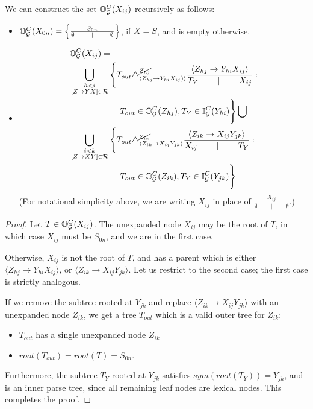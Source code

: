\documentclass{article}
\newcommand\Inner{\mathbb{I}}
\newcommand\Outer{\mathbb{O}}
\begin{document}
\begin{prop}
\label{prop-outer-set}
  We can construct the set $\Outer_\GGG^C(X_{ij})$ recursively as
  follows:
\begin{itemize}
\item $\Outer_\GGG^C(X_{0n}) = \left\{ \frac{S_{0n}}{\emptyset \qquad
      \mid \qquad \emptyset} \right\}$, if $X=S$, and is empty otherwise.
\item 
\begin{align*}
&\Outer_\GGG^C(X_{ij}) = \\
&\bigcup_{\substack{h < i \\ [Z \to YX]\in \RRR}}
\Bigg\{
T_{out} \triangle^{\cancel{Z_{hj}}}_{\langle Z_{hj} \to Y_{hi}
  X_{ij})\rangle} \frac{ \langle Z_{hj} \to Y_{hi}
  X_{ij} \rangle}{ T_Y \qquad \mid \qquad X_{ij}} : \\
&\qquad\qquad\qquad T_{out} \in \Outer_\GGG^C(Z_{hj}), T_Y \in \Inner_\GGG^C(Y_{hi}) 
\Bigg\} \bigcup\\
&\bigcup_{\substack{i < k \\ [Z \to
    XY]\in \RRR}}
\Bigg\{
T_{out} \triangle^{\cancel{Z_{ik}}}_{\langle Z_{ik} \to X_{ij} Y_{jk}
  \rangle} \frac{ \langle Z_{ik} \to X_{ij}
  Y_{jk} \rangle}{ X_{ij} \qquad \mid \qquad  T_Y } :\\
&\qquad\qquad\qquad T_{out} \in \Outer_\GGG^C(Z_{ik}),
 T_Y \in \Inner_\GGG^C(Y_{jk}) \Bigg\}\\
\end{align*}
(For notational simplicity above, we are writing $X_{ij}$ in
place of $\frac{X_{ij}}{\emptyset \qquad \mid \qquad
  \emptyset}$.)
\end{itemize}
\end{prop}
\begin{proof}
  Let $T\in \Outer_\GGG^C(X_{ij})$. The unexpanded
  node $X_{ij}$ may be the root of $T$, in which case $X_{ij}$ must be
  $S_{0n}$, and we are in the first case.

  Otherwise, $X_{ij}$ is not the root of $T$, and has a parent which
  is either $\langle Z_{hj} \to Y_{hi} X_{ij} \rangle$, or $\langle
  Z_{ik} \to X_{ij} Y_{jk} \rangle$. Let us restrict to the second
  case; the first case is strictly analogous. 
  
  If we remove the subtree rooted at $Y_{jk}$ and replace $\langle
  Z_{ik} \to X_{ij} Y_{jk} \rangle$ with an unexpanded node $Z_{ik}$, we get a
  tree $T_{out}$ which is a valid outer tree for $Z_{ik}$:
  \begin{itemize}
  \item $T_{out}$ has a single unexpanded node $Z_{ik}$
  \item $root(T_{out}) = root(T) = S_{0n}$.
  \end{itemize}
  Furthermore, the subtree $T_Y$ rooted at $Y_{jk}$ satisfies
  $sym(root(T_Y)) = Y_{jk}$, and is an inner parse tree, since all
  remaining leaf nodes are lexical nodes. This completes the proof.
  
\end{proof}
\end{document}
